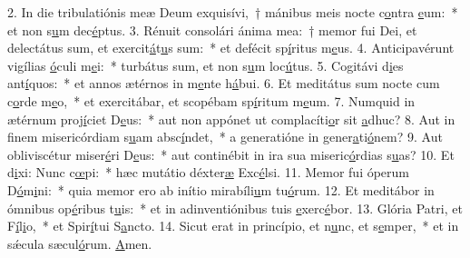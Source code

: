 2. In die tribulatiónis meæ Deum exquisívi,~† mánibus meis nocte c\uline{o}ntra \uline{e}um:~* et non s\uline{u}m dec\uline{é}ptus.
3. Rénuit consolári ánima mea:~† memor fui Dei, et delectátus sum, et exercit\uline{á}t\uline{u}s sum:~* et defécit sp\uline{í}ritus m\uline{e}us.
4. Anticipavérunt vigílias \uline{ó}culi m\uline{e}i:~* turbátus sum, et non s\uline{u}m loc\uline{ú}tus.
5. Cogitávi d\uline{i}es ant\uline{í}quos:~* et annos ætérnos in m\uline{e}nte h\uline{á}bui.
6. Et meditátus sum nocte cum c\uline{o}rde m\uline{e}o,~* et exercitábar, et scopébam sp\uline{í}ritum m\uline{e}um.
7. Numquid in ætérnum proj\uline{í}ciet D\uline{e}us:~* aut non appónet ut complacíti\uline{o}r sit \uline{a}dhuc?
8. Aut in finem misericórdiam s\uline{u}am absc\uline{í}ndet,~* a generatióne in gener\uline{a}ti\uline{ó}nem?
9. Aut obliviscétur miser\uline{é}ri D\uline{e}us:~* aut continébit in ira sua miseric\uline{ó}rdias s\uline{u}as?
10. Et d\uline{i}xi: Nunc c\uline{œ}pi:~* hæc mutátio déxter\uline{æ} Exc\uline{é}lsi.
11. Memor fui óperum D\uline{ó}m\uline{i}ni:~* quia memor ero ab inítio mirabíli\uline{u}m tu\uline{ó}rum.
12. Et meditábor in ómnibus op\uline{é}ribus t\uline{u}is:~* et in adinventiónibus tuis \uline{e}xerc\uline{é}bor.
13. Glória Patri, et F\uline{í}l\uline{i}o,~* et Spir\uline{í}tui S\uline{a}ncto.
14. Sicut erat in princípio, et n\uline{u}nc, et s\uline{e}mper,~* et in sǽcula sæcul\uline{ó}rum. \uline{A}men.
